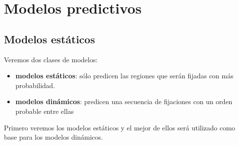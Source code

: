 \documentclass[compress]{beamer}
\begin{document}
\section{Modelos predictivos}
\subsection{Modelos estáticos}

\begin{frame}
Veremos dos clases de modelos:
\begin{itemize}
\item \textbf{modelos estáticos}: sólo predicen las regiones que serán fijadas con más probabilidad.
\item \textbf{modelos dinámicos}: predicen una secuencia de fijaciones con un orden probable entre ellas
\end{itemize}

\bigskip

Primero veremos los modelos estáticos y el mejor de ellos será utilizado como base para los modelos dinámicos.
\end{frame}
\end{document}
